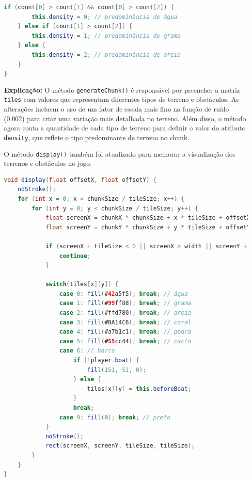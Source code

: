 \documentclass[
	12pt,				%
	oneside,			%
	a4paper,			%
	english,			%
	brazil,				%
	]{abntex2}
\begin{document}
{\begin{lstlisting}[language=Java, caption={Método \texttt{generateChunk()} Modificado}]
    if (count[0] > count[1] && count[0] > count[2]) {
        this.density = 0; // predominância de água
    } else if (count[1] > count[2]) {
        this.density = 1; // predominância de grama
    } else {
        this.density = 2; // predominância de areia
    }
}
\end{lstlisting}

\textbf{Explicação:} O método \texttt{generateChunk()} é responsável por preencher a matriz \texttt{tiles} com valores que representam diferentes tipos de terreno e obstáculos. As alterações incluem o uso de um fator de escala mais fino na função de ruído (0.002) para criar uma variação mais detalhada no terreno. Além disso, o método agora conta a quantidade de cada tipo de terreno para definir o valor do atributo \texttt{density}, que reflete o tipo predominante de terreno no chunk.


O método \texttt{display()} também foi atualizado para melhorar a visualização dos terrenos e obstáculos no jogo.

\begin{lstlisting}[language=Java, caption={Método \texttt{display()} Modificado}]
void display(float offsetX, float offsetY) {
    noStroke();
    for (int x = 0; x < chunkSize / tileSize; x++) {
        for (int y = 0; y < chunkSize / tileSize; y++) {
            float screenX = chunkX * chunkSize + x * tileSize + offsetX;
            float screenY = chunkY * chunkSize + y * tileSize + offsetY;

            if (screenX + tileSize < 0 || screenX > width || screenY + tileSize < 0 || screenY > height) {
                continue;
            }

            switch(tiles[x][y]) {
                case 0: fill(#42a5f5); break; // água
                case 1: fill(#99ff88); break; // grama
                case 2: fill(#ffd780); break; // areia
                case 3: fill(#BA14C6); break; // coral
                case 4: fill(#a7b1c1); break; // pedra
                case 5: fill(#55cc44); break; // cacto
                case 6: // barco
                    if (!player.boat) {
                        fill(151, 51, 0);
                    } else {
                        tiles[x][y] = this.beforeBoat;
                    }
                    break;
                case 9: fill(0); break; // preto
            }
            noStroke();
            rect(screenX, screenY, tileSize, tileSize);
        }
    }
}
\end{lstlisting}

}
\end{document}
